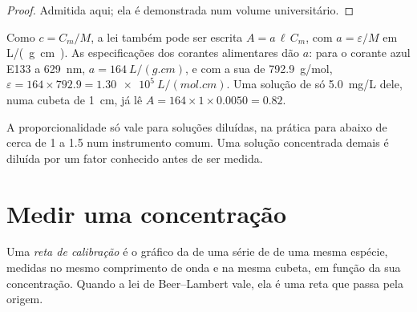 \begin{proof}
Admitida aqui; ela é demonstrada num volume universitário.
\end{proof}


\begin{remark}\label{rem:g11:absorbance:mass}
Como $c = C_m / M$, a lei também pode ser escrita $A = a\, \ell\, C_m$,
com $a = \varepsilon / M$ em \si{L/(g.cm)}. As especificações dos
corantes alimentares dão $a$: para o corante azul E133 a \qty{629}{nm},
$a =
\qty{164}{L/(g.cm)}$, e com a sua  de \qty{792.9}{g/mol},
$\varepsilon = 164 \times 792.9 = \qty{1.30e5}{L/(mol.cm)}$. Uma solução
de só \qty{5.0}{mg/L} dele, numa cubeta de \qty{1}{cm}, já lê
$A = 164 \times 1 \times 0.0050 = 0.82$.
\end{remark}

\begin{remark}\label{rem:g11:absorbance:dilute}
A proporcionalidade só vale para soluções diluídas, na prática para
 abaixo de cerca de 1 a 1.5 num instrumento comum. Uma
solução concentrada demais é diluída por um fator conhecido antes de ser
medida.
\end{remark}
\section{Medir uma concentração}

\begin{definition}\label{def:g11:absorbance:calibration-line}
Uma \emph{reta de calibração} é o gráfico da
 de uma série de  de uma mesma espécie,
medidas no mesmo comprimento de onda e na mesma cubeta, em função da sua
concentração. Quando a lei de Beer--Lambert vale, ela é uma reta que
passa pela origem.
\end{definition}

